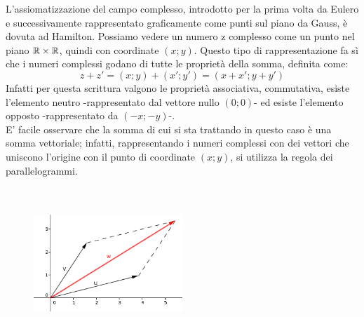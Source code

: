 L'assiomatizzazione del campo complesso, introdotto per la prima volta da Eulero e successivamente rappresentato graficamente come punti sul piano da Gauss, è dovuta ad Hamilton.
Possiamo vedere un numero z complesso come un punto nel piano $\mathbb{R} \times \mathbb{R}$, quindi con coordinate $(x;y)$. Questo tipo di rappresentazione fa sì che i numeri complessi godano di tutte le proprietà della somma, definita come:
$$z+z'=(x;y)+(x';y')=(x+x';y+y')$$
Infatti per questa scrittura valgono le proprietà associativa, commutativa, esiste l'elemento neutro -rappresentato dal vettore nullo $(0;0)$- ed esiste l'elemento opposto -rappresentato da $(-x;-y)$-.
\\
E' facile osservare che la somma di cui si sta trattando in questo caso è una somma vettoriale; infatti, rappresentando i numeri complessi con dei vettori che uniscono l'origine con il punto di coordinate $(x;y)$, si utilizza la regola dei parallelogrammi.
\\
\\
\\
\begin{figure}[h!]
  \centering
    \includegraphics[width=0.5\textwidth]{immagini/sommavettori.png}
\end{figure}

